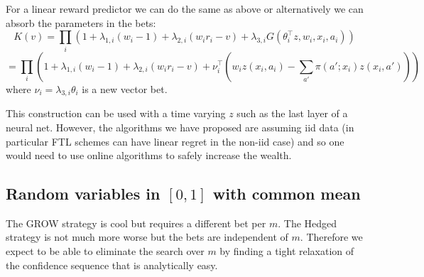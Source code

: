 For a linear reward predictor we can do the same
as above or alternatively we can absorb the 
parameters in the bets:
\[
K(v)=\prod_{i} \left(1+\lambda_{1,i} (w_i -1) 
+ \lambda_{2,i} (w_i r_i -v) 
+ \lambda_{3,i} G(\theta_i^\top z, w_i,x_i,a_i)\right)
\]
\[
=\prod_{i} \left(1+\lambda_{1,i} (w_i -1) 
+ \lambda_{2,i} (w_i r_i -v) 
+ \nu_i^\top \left(w_i z(x_i,a_i) - \sum_{a'} \pi(a';x_i) z(x_i,a') \right)\right)
\]
where $\nu_i = \lambda_{3,i}\theta_i$ is a new vector bet.

This construction can be used with a time varying $z$
such as the last layer of a neural net. However, the algorithms
we have proposed are assuming iid data (in particular FTL schemes
can have linear regret in the non-iid case) and so one would need to use online algorithms to safely increase the wealth.

\subsection{Random variables in $[0,1]$ with common mean}
\label{app:nogrid01}
The GROW strategy is cool but requires a different bet per $m$.
The Hedged strategy is not much more worse but the bets are 
independent of $m$. Therefore we expect to be able to eliminate
the search over $m$ by finding a tight relaxation of the 
confidence sequence that is analytically easy.

